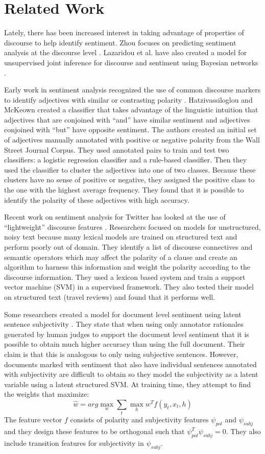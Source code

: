 \documentclass[11pt,letterpaper]{article}
\begin{document}
\section{Related Work}

Lately, there has been increased interest in taking advantage of properties of discourse to help identify sentiment.
Zhou focuses on predicting
sentiment analysis at the discourse level \cite{Zhou}. 
Lazaridou et al. have also created a model for unsupervised joint inference for
discourse and sentiment using Bayesian networks \cite{Lazaridou}.

Early work in sentiment analysis recognized the use of common discourse markers to identify adjectives with similar or contrasting polarity \cite{Hatzi}.
Hatzivassiloglou and McKeown created a classifier that takes advantage of the
linguistic intuition that adjectives that are conjoined with ``and'' have similar sentiment
and adjectives conjoined with ``but'' have opposite sentiment.  The authors
created an initial set of adjectives manually annotated with positive or negative
polarity from the Wall Street Journal Corpus. They used annotated pairs to train
and test two classifiers: a logistic regression classifier and a rule-based classifier.
Then they used the classifier to cluster the adjectives into one of two classes. Because
these clusters have no sense of positive or negative, they assigned the positive
class to the one with the highest average frequency.  They found that it is possible to identify the polarity of these adjectives
with high accuracy.

Recent work on sentiment analysis for Twitter has looked at the use of ``lightweight'' discourse features \cite{Mukherjee}.
Researchers focused on models for unstructured, noisy text because many lexical models are trained on structured text and perform poorly out of domain.
They identify a list of discourse connectives and semantic operators which may affect the polarity of a clause and create an algorithm to harness this information
and weight the polarity according to the discourse information.
They used a lexicon based system and train a support vector machine (SVM) in a supervised framework.
They also tested their model on structured text (travel reviews) and found that it performs well.

Some researchers created a model for document level sentiment using latent sentence subjectivity \cite{Yesselina}.
They state that when using only annotator rationales generated by human judges to support the document level sentiment that
it is possible to obtain much higher accuracy than using the full document.
Their claim is that this is analogous to only using subjective sentences.  However, documents marked with sentiment that also
have individual sentences annotated with subjectivity are difficult to obtain so they model the subjectivity as a latent variable using
a latent structured SVM.  
At training time, they attempt to find the weights that maximize:
$$\hat{w} = arg \max_w \sum_t \max_h w^T f(y_t, x_t, h)$$
The feature vector $f$ consists of polarity and subjectivity features $\psi_{pol}$ and $\psi_{subj}$ and they design these features to be orthogonal such that $\psi_{pol}^T\psi_{subj}=0$.
They also include transition features for subjectivity in $\psi_{subj}$.
\end{document}
